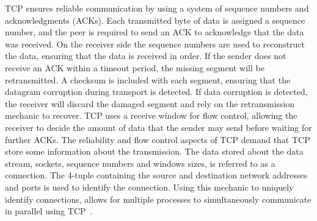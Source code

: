 \documentclass[english, 12pt, a4paper, elec, utf8, a-2b, online]{aaltothesis}
\begin{document}
TCP ensures reliable communication by using a system of sequence numbers and
acknowledgments (ACKs). Each transmitted byte of data is assigned a sequence
number, and the peer is required to send an ACK to acknowledge that the data was
received. On the receiver side the sequence numbers are used to reconstruct the
data, ensuring that the data is received in order. If the sender does not receive
an ACK within a timeout period, the missing segment will be retransmitted. A
checksum is included with each segment, ensuring that the datagram corruption during
transport is detected. If data corruption is detected, the receiver will
discard the damaged segment and rely on the retransmission mechanic to recover.
TCP uses a receive window for flow control, allowing the receiver to decide 
the amount of data that the sender may send before waiting for further ACKs. The
reliability and flow control aspects of TCP demand that TCP store some
information about the transmission. The data stored about the data stream, sockets,
sequence numbers and windows sizes, is referred to as a connection. The 4-tuple
containing the source and destination network addresses and ports is used
to identify the connection. Using this mechanic to uniquely identify connections,
allows for multiple processes to simultaneously communicate in parallel using TCP~\cite{rfc793}.
\end{document}
